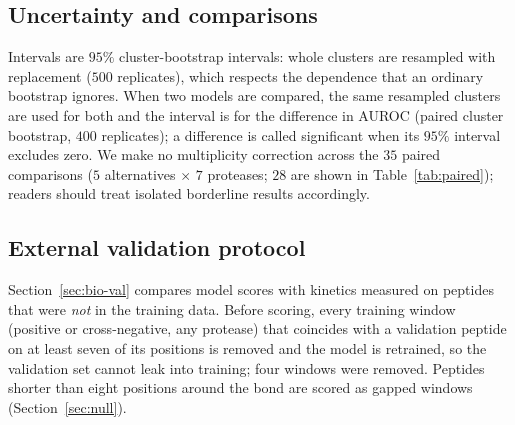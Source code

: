 \subsection{Uncertainty and comparisons}
Intervals are $95\%$ cluster-bootstrap intervals: whole clusters are resampled with replacement ($500$ replicates), which respects the dependence that an ordinary bootstrap ignores. When two models are compared, the same resampled clusters are used for both and the interval is for the difference in AUROC (paired cluster bootstrap, $400$ replicates); a difference is called significant when its $95\%$ interval excludes zero. We make no multiplicity correction across the $35$ paired comparisons ($5$ alternatives $\times$ $7$ proteases; $28$ are shown in Table~\ref{tab:paired}); readers should treat isolated borderline results accordingly.

\subsection{External validation protocol}
Section~\ref{sec:bio-val} compares model scores with kinetics measured on peptides that were \emph{not} in the training data. Before scoring, every training window (positive or cross-negative, any protease) that coincides with a validation peptide on at least seven of its positions is removed and the model is retrained, so the validation set cannot leak into training; four windows were removed. Peptides shorter than eight positions around the bond are scored as gapped windows (Section~\ref{sec:null}).
